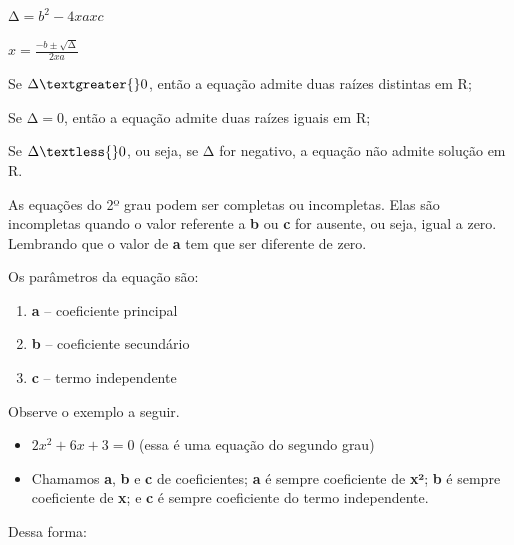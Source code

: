 {{{\begin{escolha}
{{$\mathrm{\Delta} = b^{2} - 4 x a x c$

$x = \frac{- b \pm \sqrt{\mathrm{\Delta}}}{2 x a}$

Se $\mathrm{\Delta} \textgreater{}0$, então a equação admite duas raízes distintas em
R;

Se $\mathrm{\Delta} = 0$, então a equação admite duas raízes iguais em R;

Se $\mathrm{\Delta} \textless{}0$, ou seja, se $\mathrm{\Delta}$ for 
negativo, a equação não admite solução em R.

As equações do 2º grau podem ser completas ou incompletas. Elas são
incompletas quando o valor referente a \textbf{b} ou \textbf{c} for
ausente, ou seja, igual a zero. Lembrando que o valor de \textbf{a} tem
que ser diferente de zero.

Os parâmetros da equação são:

\begin{enumerate}
  \item \textbf{a} -- coeficiente principal

  \item \textbf{b} -- coeficiente secundário

  \item \textbf{c} -- termo independente
\end{enumerate}

Observe o exemplo a seguir.

\begin{itemize}
\item
  $2x^2 + 6x + 3 = 0$ (essa é uma equação do segundo grau)
\item
  Chamamos \textbf{a}, \textbf{b} e \textbf{c} de coeficientes; \textbf{a}
  é sempre coeficiente de \textbf{x²}; \textbf{b} é sempre coeficiente de 
  \textbf{x}; e \textbf{c} é sempre coeficiente do termo independente.
\end{itemize}

Dessa forma:

}

}
\end{escolha}}}}
